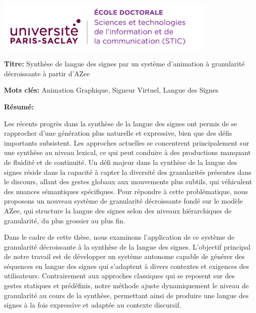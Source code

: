 \documentclass[english,12pt,a4paper]{book}
\begin{document}
\lhead{}
\rhead{}
\rfoot{}
\cfoot{}
\lfoot{}

\noindent 
\includegraphics[height=2.45cm]{logo_ups_STIC.png}
\vspace{1cm}
\selectfont

\small

\begin{mdframed}[linecolor=Prune,linewidth=1]

\textbf{Titre:} Synthèse de langue des signes par un système d'animation à granularité décroissante à partir d'AZee

\noindent \textbf{Mots clés:} Animation Graphique, Signeur Virtuel, Langue des Signes

\vspace{-.5cm}
\begin{multicols}{2}
\noindent \textbf{Résumé:}

Les récents progrès dans la synthèse de la langue des signes ont permis de se rapprocher d'une génération plus naturelle et expressive, bien que des défis importants subsistent. Les approches actuelles se concentrent principalement sur une synthèse au niveau lexical, ce qui peut conduire à des productions manquant de fluidité et de continuité. Un défi majeur dans la synthèse de la langue des signes réside dans la capacité à capter la diversité des granularités présentes dans le discours, allant des gestes globaux aux mouvements plus subtils, qui véhiculent des nuances sémantiques spécifiques. Pour répondre à cette problématique, nous proposons un nouveau système de granularité décroissante fondé sur le modèle AZee, qui structure la langue des signes selon des niveaux hiérarchiques de granularité, du plus grossier au plus fin.

Dans le cadre de cette thèse, nous examinons l'application de ce système de granularité décroissante à la synthèse de la langue des signes. L'objectif principal de notre travail est de développer un système autonome capable de générer des séquences en langue des signes qui s'adaptent à divers contextes et exigences des utilisateurs. Contrairement aux approches classiques qui se reposent sur des gestes statiques et prédéfinis, notre méthode ajuste dynamiquement le niveau de granularité au cours de la synthèse, permettant ainsi de produire une langue des signes à la fois expressive et adaptée au contexte discursif.


\end{multicols}
\end{mdframed}
\end{document}
